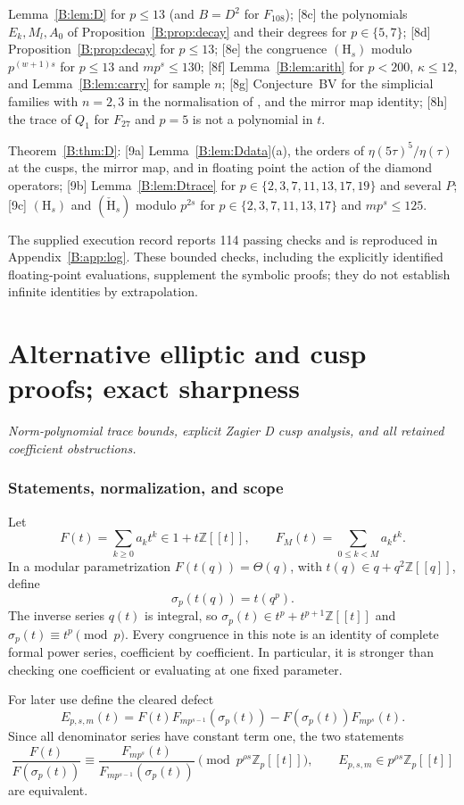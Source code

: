 \documentclass[11pt,a4paper]{article}
\theoremstyle{definition}\newtheorem{definition}[theorem]{Definition}
\theoremstyle{remark}\newtheorem{remark}[theorem]{Remark}
\newcommand{\Z}{\mathbb Z}
\newcommand{\Zp}{\mathbb Z_p}
\numberwithin{equation}{section}
\newcommand{\partstart}[3]{\clearpage\part{#1}\label{#2}\noindent\textit{#3}\par\medskip}
\begin{document}
\begin{enumerate}[label={[\arabic*]}]
[8b] Lemma~\ref{B:lem:D} for $p\le13$ (and $B=D^2$ for $F_{108}$); [8c] the polynomials $E_k,M_l,A_0$ of
Proposition~\ref{B:prop:decay} and their degrees for $p\in\{5,7\}$; [8d] Proposition~\ref{B:prop:decay} for $p\le13$; [8e]
the congruence $(\mathrm H_s)$ modulo $p^{(w+1)s}$ for $p\le13$ and $mp^s\le130$; [8f] Lemma~\ref{B:lem:arith} for $p<200$,
$\kappa\le12$, and Lemma~\ref{B:lem:carry} for sample $n$; [8g] Conjecture~BV for the simplicial families with $n=2,3$ in
the normalisation of \cite{BV3}, and the mirror map identity; [8h] the trace of $Q_1$ for $F_{27}$ and $p=5$ is not a
polynomial in $t$.
\item Theorem~\ref{B:thm:D}: [9a] Lemma~\ref{B:lem:Ddata}(a), the orders of $\eta(5\tau)^5/\eta(\tau)$ at the cusps, the
mirror map, and in floating point the action of the diamond operators; [9b] Lemma~\ref{B:lem:Dtrace} for
$p\in\{2,3,7,11,13,17,19\}$ and several $P$; [9c] $(\mathrm H_s)$ and $(\check{\mathrm H}_s)$ modulo $p^{2s}$ for
$p\in\{2,3,7,11,13,17\}$ and $mp^s\le125$.
\end{enumerate}
The supplied execution record reports 114 passing checks and is reproduced in Appendix~\ref{B:app:log}. These bounded checks, including the explicitly identified floating-point evaluations, supplement the symbolic proofs; they do not establish infinite identities by extrapolation.





\partstart{Alternative elliptic and cusp proofs; exact sharpness}{part:exceptional}{Norm-polynomial trace bounds, explicit Zagier D cusp analysis, and all retained coefficient obstructions.}
\section{Statements, normalization, and scope}\label{E:source-main-1}

Let
\[
 F(t)=\sum_{k\geq0}a_kt^k\in1+t\Z[[t]],\qquad
 F_M(t)=\sum_{0\leq k<M}a_kt^k.
\]
In a modular parametrization $F(t(q))=\Theta(q)$, with
$t(q)\in q+q^2\Z[[q]]$, define
\[
 \sigma_p(t(q))=t(q^p).
\]
The inverse series $q(t)$ is integral, so
$\sigma_p(t)\in t^p+t^{p+1}\Z[[t]]$ and
$\sigma_p(t)\equiv t^p\pmod p$.  Every congruence in this note is an
identity of complete formal power series, coefficient by coefficient.
In particular, it is stronger than checking one coefficient or evaluating
at one fixed parameter.

For later use define the cleared defect
\begin{equation}\label{E:eq:defect}
 E_{p,s,m}(t)=F(t)F_{mp^{s-1}}(\sigma_p(t))
             -F(\sigma_p(t))F_{mp^s}(t).
\end{equation}
Since all denominator series have constant term one, the two statements
\begin{equation}\label{E:eq:quotient}
 \frac{F(t)}{F(\sigma_p(t))}
 \equiv\frac{F_{mp^s}(t)}{F_{mp^{s-1}}(\sigma_p(t))}
 \pmod{p^{\rho s}\Zp[[t]]},\qquad
 E_{p,s,m}\in p^{\rho s}\Zp[[t]]
\end{equation}
are equivalent.
\end{document}
